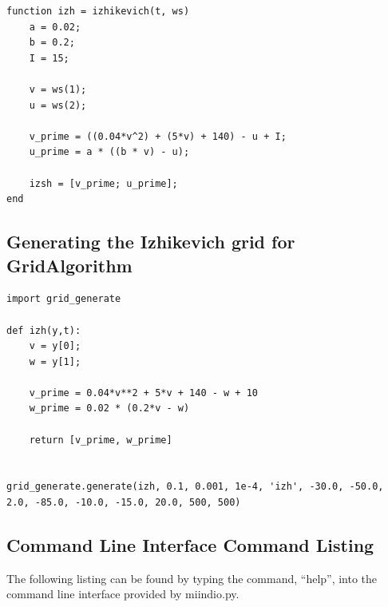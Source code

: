 \documentclass[utf8]{frontiers_suppmat} %
\begin{document}
\begin{lstlisting}[caption={File izhikevich.m.}]
function izh = izhikevich(t, ws)
    a = 0.02;
    b = 0.2;
    I = 15;
    
    v = ws(1);
    u = ws(2);
    
    v_prime = ((0.04*v^2) + (5*v) + 140) - u + I;
    u_prime = a * ((b * v) - u);
    
    izsh = [v_prime; u_prime];
end
\end{lstlisting}

\subsection{Generating the Izhikevich grid for GridAlgorithm}

\begin{lstlisting}
import grid_generate

def izh(y,t):
    v = y[0];
    w = y[1];

    v_prime = 0.04*v**2 + 5*v + 140 - w + 10
    w_prime = 0.02 * (0.2*v - w)

    return [v_prime, w_prime]


grid_generate.generate(izh, 0.1, 0.001, 1e-4, 'izh', -30.0, -50.0, 2.0, -85.0, -10.0, -15.0, 20.0, 500, 500)
\end{lstlisting}

\subsection{Command Line Interface Command Listing}
\label{clilisting}

The following listing can be found by typing the command, ``help'', into the command line interface provided by miindio.py.
\end{document}
